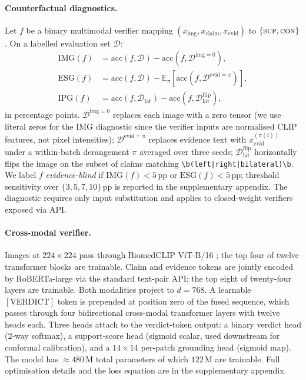 \documentclass{article}
\begin{document}
\paragraph{Counterfactual diagnostics.} Let $f$ be a binary
multimodal verifier mapping
$(x_{\mathrm{img}}, x_{\mathrm{claim}}, x_{\mathrm{evid}})$ to
$\{\textsc{sup}, \textsc{con}\}$. On a labelled evaluation set
$\mathcal{D}$:
\begin{align}
\mathrm{IMG}(f) &= \mathrm{acc}(f, \mathcal{D}) -
                   \mathrm{acc}(f, \mathcal{D}^{\mathrm{img}=0}), \\
\mathrm{ESG}(f) &= \mathrm{acc}(f, \mathcal{D}) -
                   \mathbb{E}_{\pi}\!\left[\mathrm{acc}(f, \mathcal{D}^{\mathrm{evid}=\pi})\right], \\
\mathrm{IPG}(f) &= \mathrm{acc}(f, \mathcal{D}_{\mathrm{lat}}) -
                   \mathrm{acc}(f, \mathcal{D}_{\mathrm{lat}}^{\mathrm{flip}}),
\end{align}
in percentage points. $\mathcal{D}^{\mathrm{img}=0}$ replaces each
image with a zero tensor (we use literal zeros for the IMG diagnostic
since the verifier inputs are normalised CLIP features, not pixel
intensities); $\mathcal{D}^{\mathrm{evid}=\pi}$ replaces evidence
text with $x_{\mathrm{evid}}^{(\pi(i))}$ under a within-batch
derangement $\pi$ averaged over three seeds;
$\mathcal{D}_{\mathrm{lat}}^{\mathrm{flip}}$ horizontally flips the
image on the subset of claims matching
\texttt{\textbackslash b(left|right|bilateral)\textbackslash b}.
We label $f$ \emph{evidence-blind} if $\mathrm{IMG}(f) < 5$\,pp or
$\mathrm{ESG}(f) < 5$\,pp; threshold sensitivity over
$\{3, 5, 7, 10\}$\,pp is reported in the supplementary appendix.
The diagnostic requires only input substitution and applies to
closed-weight verifiers exposed via API.

\paragraph{Cross-modal verifier.} Images at $224 \times 224$ pass
through BiomedCLIP ViT-B/16 \citep{zhang2024biomedclip}; the top
four of twelve transformer blocks are trainable. Claim and evidence
tokens are jointly encoded by RoBERTa-large \citep{liu2019roberta}
via the standard text-pair API; the top eight of twenty-four layers
are trainable. Both modalities project to $d = 768$. A learnable
$[\mathrm{VERDICT}]$ token is prepended at position zero of the
fused sequence, which passes through four bidirectional cross-modal
transformer layers with twelve heads each. Three heads attach to
the verdict-token output: a binary verdict head (2-way softmax), a
support-score head (sigmoid scalar, used downstream for conformal
calibration), and a $14 \times 14$ per-patch grounding head (sigmoid
map). The model has $\approx 480$\,M total parameters of which
$122$\,M are trainable. Full optimisation details and the loss
equation are in the supplementary appendix.
\end{document}
